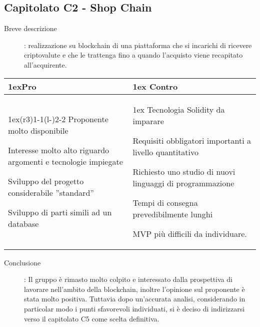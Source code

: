 \subsection{Capitolato C2 - Shop Chain}
\begin{description}
\item [Breve descrizione]: realizzazione su blockchain di una piattaforma che si incarichi di ricevere criptovalute e che le trattenga fino a quando l'acquisto viene recapitato all’acquirente.
\end{description}
\begin{table}[h]
\begin{tabularx}{\linewidth}{>{\parskip1ex}X@{\kern4\tabcolsep}>{\parskip1ex}X}
\hfil\bfseries Pro
&
\hfil\bfseries Contro
\\\cmidrule(r{3\tabcolsep}){1-1}\cmidrule(l{-\tabcolsep}){2-2}
Proponente molto disponibile \par
Interesse molto alto riguardo argomenti e tecnologie impiegate \par
Sviluppo del progetto considerabile ”standard” \par
Sviluppo di parti simili ad un database
&
Tecnologia Solidity da imparare \par 
Requisiti obbligatori importanti a livello quantitativo \par
Richiesto uno studio di nuovi linguaggi di programmazione \par
Tempi di consegna prevedibilmente lunghi \par
MVP più difficili da individuare. \\
\end{tabularx}
\end{table}
\begin{description}
	\item [Conclusione]: Il gruppo è rimasto molto colpito e interessato dalla prospettiva di lavorare nell'ambito della blockchain, inoltre l'opinione sul proponente è stata molto positiva. Tuttavia dopo un'accurata analisi, considerando in particolar modo i punti sfavorevoli individuati, si è deciso di indirizzarsi verso il capitolato C5 come scelta definitiva.
\end{description}

\vspace{1cm}

